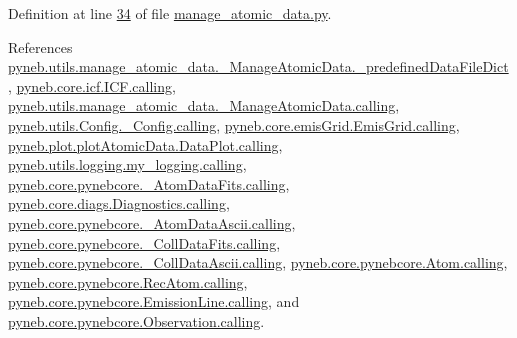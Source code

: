 Definition at line \hyperlink{manage__atomic__data_8py_source_l00034}{34} of file \hyperlink{manage__atomic__data_8py_source}{manage\+\_\+atomic\+\_\+data.\+py}.



References \hyperlink{manage__atomic__data_8py_source_l00019}{pyneb.\+utils.\+manage\+\_\+atomic\+\_\+data.\+\_\+\+Manage\+Atomic\+Data.\+\_\+predefined\+Data\+File\+Dict}, \hyperlink{icf_8py_source_l00016}{pyneb.\+core.\+icf.\+I\+C\+F.\+calling}, \hyperlink{manage__atomic__data_8py_source_l00018}{pyneb.\+utils.\+manage\+\_\+atomic\+\_\+data.\+\_\+\+Manage\+Atomic\+Data.\+calling}, \hyperlink{_config_8py_source_l00032}{pyneb.\+utils.\+Config.\+\_\+\+Config.\+calling}, \hyperlink{emis_grid_8py_source_l00041}{pyneb.\+core.\+emis\+Grid.\+Emis\+Grid.\+calling}, \hyperlink{plot_atomic_data_8py_source_l00042}{pyneb.\+plot.\+plot\+Atomic\+Data.\+Data\+Plot.\+calling}, \hyperlink{logging_8py_source_l00044}{pyneb.\+utils.\+logging.\+my\+\_\+logging.\+calling}, \hyperlink{pynebcore_8py_source_l00090}{pyneb.\+core.\+pynebcore.\+\_\+\+Atom\+Data\+Fits.\+calling}, \hyperlink{diags_8py_source_l00169}{pyneb.\+core.\+diags.\+Diagnostics.\+calling}, \hyperlink{pynebcore_8py_source_l00311}{pyneb.\+core.\+pynebcore.\+\_\+\+Atom\+Data\+Ascii.\+calling}, \hyperlink{pynebcore_8py_source_l00568}{pyneb.\+core.\+pynebcore.\+\_\+\+Coll\+Data\+Fits.\+calling}, \hyperlink{pynebcore_8py_source_l00918}{pyneb.\+core.\+pynebcore.\+\_\+\+Coll\+Data\+Ascii.\+calling}, \hyperlink{pynebcore_8py_source_l01175}{pyneb.\+core.\+pynebcore.\+Atom.\+calling}, \hyperlink{pynebcore_8py_source_l02572}{pyneb.\+core.\+pynebcore.\+Rec\+Atom.\+calling}, \hyperlink{pynebcore_8py_source_l03263}{pyneb.\+core.\+pynebcore.\+Emission\+Line.\+calling}, and \hyperlink{pynebcore_8py_source_l03419}{pyneb.\+core.\+pynebcore.\+Observation.\+calling}.


